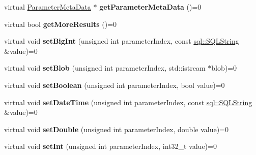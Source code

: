 \begin{DoxyCompactItemize}
\item 
\hypertarget{classsql_1_1_prepared_statement_a3821a7e45796c1f4c294a79d673c2b1b}{}\label{classsql_1_1_prepared_statement_a3821a7e45796c1f4c294a79d673c2b1b} 
virtual \hyperlink{classsql_1_1_parameter_meta_data}{Parameter\+Meta\+Data} $\ast$ {\bfseries get\+Parameter\+Meta\+Data} ()=0
\item 
\hypertarget{classsql_1_1_prepared_statement_a97c0111b24e1892cc14f205048f82d3a}{}\label{classsql_1_1_prepared_statement_a97c0111b24e1892cc14f205048f82d3a} 
virtual bool {\bfseries get\+More\+Results} ()=0
\item 
\hypertarget{classsql_1_1_prepared_statement_a55b817ad2ba6db8f8afbad78877204a8}{}\label{classsql_1_1_prepared_statement_a55b817ad2ba6db8f8afbad78877204a8} 
virtual void {\bfseries set\+Big\+Int} (unsigned int parameter\+Index, const \hyperlink{classsql_1_1_s_q_l_string}{sql\+::\+S\+Q\+L\+String} \&value)=0
\item 
\hypertarget{classsql_1_1_prepared_statement_a33c8a20a7113c036c17052389d7cf654}{}\label{classsql_1_1_prepared_statement_a33c8a20a7113c036c17052389d7cf654} 
virtual void {\bfseries set\+Blob} (unsigned int parameter\+Index, std\+::istream $\ast$blob)=0
\item 
\hypertarget{classsql_1_1_prepared_statement_af1a2c45823deccd67986f0ac885bfa53}{}\label{classsql_1_1_prepared_statement_af1a2c45823deccd67986f0ac885bfa53} 
virtual void {\bfseries set\+Boolean} (unsigned int parameter\+Index, bool value)=0
\item 
\hypertarget{classsql_1_1_prepared_statement_ad560f5e769937f023376092bd4f917ce}{}\label{classsql_1_1_prepared_statement_ad560f5e769937f023376092bd4f917ce} 
virtual void {\bfseries set\+Date\+Time} (unsigned int parameter\+Index, const \hyperlink{classsql_1_1_s_q_l_string}{sql\+::\+S\+Q\+L\+String} \&value)=0
\item 
\hypertarget{classsql_1_1_prepared_statement_aaac3aa72e3439a4b190e1e489bf898d9}{}\label{classsql_1_1_prepared_statement_aaac3aa72e3439a4b190e1e489bf898d9} 
virtual void {\bfseries set\+Double} (unsigned int parameter\+Index, double value)=0
\item 
\hypertarget{classsql_1_1_prepared_statement_ab72e4c67803ef1530636871709d1d5e3}{}\label{classsql_1_1_prepared_statement_ab72e4c67803ef1530636871709d1d5e3} 
virtual void {\bfseries set\+Int} (unsigned int parameter\+Index, int32\+\_\+t value)=0
\item 
\hypertarget{classsql_1_1_prepared_statement_ad9585903096ec5b87803b8f621d3befb}{}\label{classsql_1_1_prepared_statement_ad9585903096ec5b87803b8f621d3befb} 

\end{DoxyCompactItemize}
